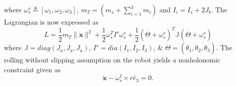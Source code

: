\documentclass{ifacconf}
\begin{document}
where $\omega_{s}^{s} \triangleq [\omega_{1},\omega_{2},\omega_{3}]$, $m_{T}= (m_{s} + \sum_{i = 1}^{3} m_{i})$ and $I_{i} = I_{s} + 2 J_{b}$. The Lagrangian is now expressed as 
\begin{equation}\label{lagrange}
L = \frac{1}{2} m_{T} \|\dot{\mathbf{x}}\|^{2} + \frac{1}{2} \omega_{s}^{T}I^{s} \omega_{s}^{s} + \frac{1}{2}\left( \dot{\Theta} + \omega_{s}^{s}\right)^{T}\mathbb{J}\left(\dot{\Theta} + \omega_{s}^{s}\right)
\end{equation}
where $\mathbb{J} = diag(J_{a},J_{a},J_{a})$, $I^{s}=dia(I_{1},I_{2},I_{3})$, $\&$ $\dot{\Theta}=(\dot{\theta}_{1},\dot{\theta}_{2},\dot{\theta}_{3})$. The rolling without slipping assumption on the robot yields a nonholonomic constraint given as
\begin{equation}\label{constr1}
\dot{\mathbf{x}}- \omega_{s}^{I}\times r\hat{e}_{3} =0.
\end{equation}
\end{document}
